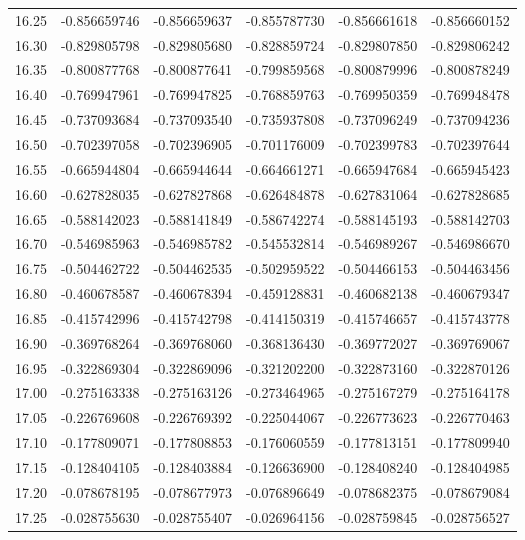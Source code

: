 \documentclass[11pt,a4paper]{article}
\begin{document}
\begin{longtable}{rrrrrr}
16.25 & -0.856659746 & -0.856659637 & -0.855787730 & -0.856661618 & -0.856660152 \\
16.30 & -0.829805798 & -0.829805680 & -0.828859724 & -0.829807850 & -0.829806242 \\
16.35 & -0.800877768 & -0.800877641 & -0.799859568 & -0.800879996 & -0.800878249 \\
16.40 & -0.769947961 & -0.769947825 & -0.768859763 & -0.769950359 & -0.769948478 \\
16.45 & -0.737093684 & -0.737093540 & -0.735937808 & -0.737096249 & -0.737094236 \\
16.50 & -0.702397058 & -0.702396905 & -0.701176009 & -0.702399783 & -0.702397644 \\
16.55 & -0.665944804 & -0.665944644 & -0.664661271 & -0.665947684 & -0.665945423 \\
16.60 & -0.627828035 & -0.627827868 & -0.626484878 & -0.627831064 & -0.627828685 \\
16.65 & -0.588142023 & -0.588141849 & -0.586742274 & -0.588145193 & -0.588142703 \\
16.70 & -0.546985963 & -0.546985782 & -0.545532814 & -0.546989267 & -0.546986670 \\
16.75 & -0.504462722 & -0.504462535 & -0.502959522 & -0.504466153 & -0.504463456 \\
16.80 & -0.460678587 & -0.460678394 & -0.459128831 & -0.460682138 & -0.460679347 \\
16.85 & -0.415742996 & -0.415742798 & -0.414150319 & -0.415746657 & -0.415743778 \\
16.90 & -0.369768264 & -0.369768060 & -0.368136430 & -0.369772027 & -0.369769067 \\
16.95 & -0.322869304 & -0.322869096 & -0.321202200 & -0.322873160 & -0.322870126 \\
17.00 & -0.275163338 & -0.275163126 & -0.273464965 & -0.275167279 & -0.275164178 \\
17.05 & -0.226769608 & -0.226769392 & -0.225044067 & -0.226773623 & -0.226770463 \\
17.10 & -0.177809071 & -0.177808853 & -0.176060559 & -0.177813151 & -0.177809940 \\
17.15 & -0.128404105 & -0.128403884 & -0.126636900 & -0.128408240 & -0.128404985 \\
17.20 & -0.078678195 & -0.078677973 & -0.076896649 & -0.078682375 & -0.078679084 \\
17.25 & -0.028755630 & -0.028755407 & -0.026964156 & -0.028759845 & -0.028756527 \\

\end{longtable}
\end{document}
